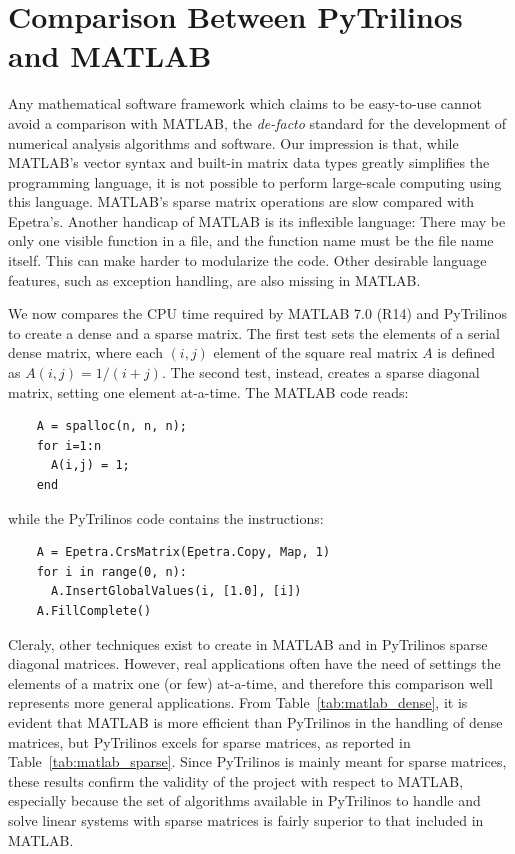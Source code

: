 \documentclass[10pt,relax]{SANDreport}
\begin{document}
\section{Comparison Between PyTrilinos and MATLAB}
\label{sec:comparison_matlab}

Any mathematical software framework which
claims to be easy-to-use cannot avoid a comparison with MATLAB, the
{\sl de-facto} standard for the development of numerical analysis
algorithms and software. Our impression is that, while MATLAB's
vector syntax and built-in matrix data types greatly simplifies the
programming language, it is not possible to perform large-scale
computing using this language. MATLAB's sparse matrix operations are
slow compared with Epetra's. Another handicap of MATLAB is its
inflexible language: There may be only one visible function in a
file, and the function name must be the file name itself. This can
make harder to modularize the code.  Other desirable language
features, such as exception handling, are also missing in MATLAB.

We now compares the CPU time required by MATLAB 7.0 (R14) and
PyTrilinos to create a dense and a sparse matrix. 
The first test sets the elements
of a serial dense matrix, where each $(i,j)$ element of the square real
matrix $A$ is defined as $A(i,j) = 1/(i + j)$. The second test,
instead, creates a sparse diagonal matrix, setting one element
at-a-time. The MATLAB code reads:
\begin{verbatim}
    A = spalloc(n, n, n);
    for i=1:n
      A(i,j) = 1;
    end
\end{verbatim}
while the PyTrilinos code contains the instructions:
\begin{verbatim}
    A = Epetra.CrsMatrix(Epetra.Copy, Map, 1)
    for i in range(0, n):
      A.InsertGlobalValues(i, [1.0], [i])
    A.FillComplete()
\end{verbatim}
Cleraly, other techniques exist to create in MATLAB and in PyTrilinos sparse
diagonal matrices. However, real applications often have the need of settings
the elements of a matrix one (or few) at-a-time, and therefore this comparison
well represents more general applications. From Table~\ref{tab:matlab_dense},
  it is evident that MATLAB is more efficient than PyTrilinos in the handling
  of dense matrices, but PyTrilinos excels for sparse matrices, as reported in
  Table~\ref{tab:matlab_sparse}. Since PyTrilinos is mainly meant for sparse
  matrices, these results confirm the validity of the project with respect to
  MATLAB, especially because the set of algorithms available in PyTrilinos to
  handle and solve linear systems with sparse matrices is fairly superior to
  that included in MATLAB.
\end{document}
